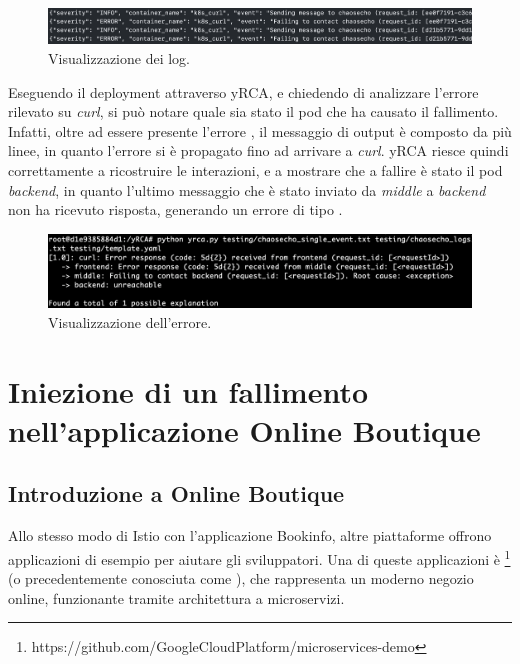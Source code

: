 \begin{figure}[h]
    \centering
    \includegraphics[width=\textwidth]{immagini/capitolo5/chaosecho_logs.png}
    \caption{Visualizzazione dei log.}
    \label{fig:chaosecho-logs}
\end{figure}

Eseguendo il deployment attraverso yRCA, e chiedendo di analizzare l'errore rilevato su \textit{curl}, si può notare quale sia stato il pod che ha causato il fallimento. Infatti, oltre ad essere presente l'errore , il messaggio di output è composto da più linee, in quanto l'errore si è propagato  fino ad arrivare a \textit{curl}. yRCA riesce quindi correttamente a ricostruire le interazioni, e a mostrare che a fallire è stato il pod \textit{backend}, in quanto l'ultimo messaggio che è stato inviato da \textit{middle} a \textit{backend} non ha ricevuto risposta, generando un errore di tipo  \myenquote{\texttt{Failing to contact [Service Name]]}}.


\begin{figure}[h]
    \centering
    \includegraphics[width=\textwidth]{immagini/capitolo5/chaosecho_yrca.png}
    \caption{Visualizzazione dell'errore.}
    \label{fig:chaosecho-error}
\end{figure}

\section{Iniezione di un fallimento nell'applicazione Online Boutique} \label{sect:Iniezione di un fallimento nell'applicazione Online Boutique}

\subsection{Introduzione a Online Boutique}

Allo stesso modo di Istio con l'applicazione Bookinfo, altre piattaforme offrono applicazioni di esempio per aiutare gli sviluppatori. Una di queste applicazioni è \footnote{https://github.com/GoogleCloudPlatform/microservices-demo} (o precedentemente conosciuta come ), che rappresenta un moderno negozio online, funzionante tramite architettura a microservizi.

